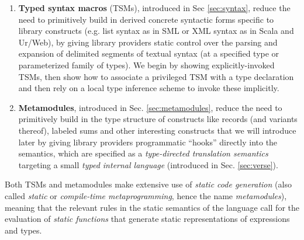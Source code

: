 \begin{enumerate}
\item \textbf{Typed syntax macros} (TSMs), introduced in Sec \ref{sec:syntax}, reduce the need to primitively build in derived concrete syntactic forms specific to library constructs (e.g. list syntax as in SML or XML syntax as in Scala and Ur/Web), by giving library providers static control over the parsing and expansion of delimited segments of textual syntax (at a specified type or parameterized family of types). We begin by showing explicitly-invoked TSMs, then show how to associate a privileged TSM with a type declaration and then rely on a local type inference scheme to invoke these implicitly.
\item \textbf{Metamodules}, introduced in Sec. \ref{sec:metamodules}, reduce the need to primitively build in the type structure of constructs like records (and variants thereof),  labeled sums and other interesting constructs that we will introduce later by giving library providers programmatic ``hooks'' directly into the semantics, which are specified as a \emph{type-directed translation semantics} targeting a small \emph{typed internal language} (introduced in Sec. \ref{sec:verse}). %
\end{enumerate} 
Both TSMs and metamodules make extensive use of \emph{static code generation} (also called \emph{static} or \emph{compile-time metaprogramming}, hence the name \emph{metamodules}), meaning that the relevant rules in the static semantics of the language call for the evaluation of \emph{static functions} that generate static representations of expressions and types. %
